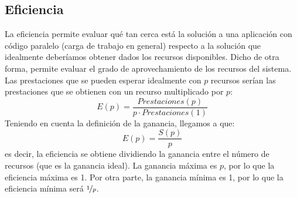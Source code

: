 \subsection{Eficiencia}
La eficiencia permite evaluar qué tan cerca está la solución a una aplicación con código paralelo (carga de trabajo en general) respecto a la solución que idealmente deberíamos obtener dados los recursos disponibles. Dicho de otra forma, permite evaluar el grado de aprovechamiento de los recursos del sistema. Las prestaciones que se pueden esperar idealmente con $p$ recursos serían las prestaciones que se obtienen con un recurso multiplicado por $p$:
\begin{equation*}
    E(p) = \dfrac{Prestaciones(p)}{p\cdot Prestaciones(1)}
\end{equation*}
Teniendo en cuenta la definición de la ganancia, llegamos a que:
\begin{equation}
    E(p) = \dfrac{S(p)}{p}
\end{equation}
es decir, la eficiencia se obtiene dividiendo la ganancia entre el número de recursos (que es la ganancia ideal). La ganancia máxima es $p$, por lo que la eficiencia máxima es 1. Por otra parte, la ganancia mínima es 1, por lo que la eficiencia mínima será $\nicefrac{1}{p}$.


